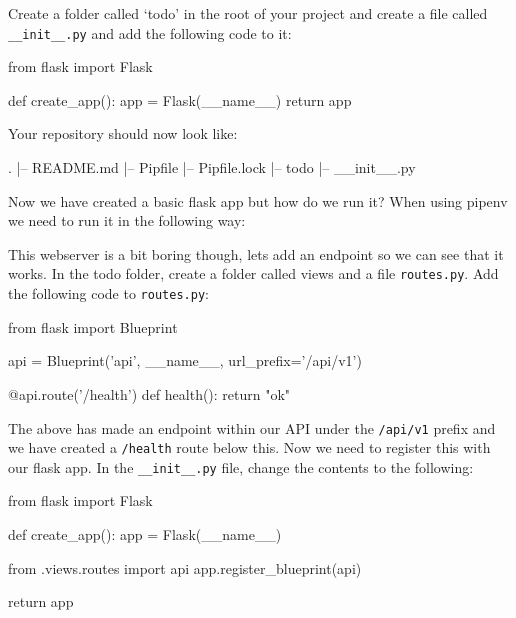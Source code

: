 \documentclass{csse4400}
\begin{document}
Create a folder called  `todo' in the root of your project and create a file called \texttt{\_\_init\_\_.py} and add the following code to it:

\begin{code}[language=python]{}
  from flask import Flask

  def create_app():
      app = Flask(__name__)
      return app
\end{code}

Your repository should now look like:

\begin{code}[language=bash,numbers=none]{}
  .
  |-- README.md
  |-- Pipfile
  |-- Pipfile.lock
  |-- todo
      |-- __init__.py
\end{code}

Now we have created a basic flask app but how do we run it? When using pipenv we need to run it in the following way:


This webserver is a bit boring though, lets add an endpoint so we can see that it works. In the todo folder, create a folder called views and a file \texttt{routes.py}. Add the following code to  \texttt{routes.py}:

\begin{code}[language=python]{}

  from flask import Blueprint

  api = Blueprint('api', __name__, url_prefix='/api/v1')

  @api.route('/health')
  def health():
      return "ok"

\end{code}

The above has made an endpoint within our API under the \texttt{/api/v1} prefix and we have created a \texttt{/health} route below this. Now we need to register this with our flask app. In the \texttt{\_\_init\_\_.py} file, change the contents to the following:

\begin{code}[language=python]{}
  from flask import Flask

  def create_app():
      app = Flask(__name__)
      
      from .views.routes import api
      app.register_blueprint(api)
      
      return app

\end{code}
\end{document}
